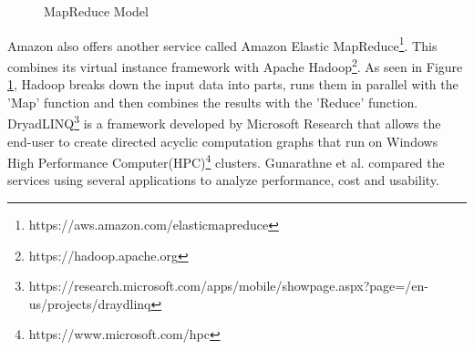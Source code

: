 \documentclass[12pt]{article}
\begin{document}
\begin{figure}
    \begin{center}
    \end{center}
    \caption{MapReduce Model}
    \label{fig:map}
\end{figure}

Amazon also offers another service called Amazon Elastic
MapReduce\footnote{https://aws.amazon.com/elasticmapreduce}. This combines its
virtual instance framework with Apache
Hadoop\footnote{https://hadoop.apache.org}. As seen in Figure \ref{fig:map},
Hadoop breaks down the input data into parts, runs them in parallel with the
'Map' function and then combines the results with the 'Reduce' function.
DryadLINQ\footnote{https://research.microsoft.com/apps/mobile/showpage.aspx?page=/en-us/projects/draydlinq}
is a framework developed by Microsoft Research that allows the end-user to
create directed acyclic computation graphs that run on Windows High Performance
Computer(HPC)\footnote{https://www.microsoft.com/hpc} clusters.  Gunarathne et
al. compared the services using several applications to analyze performance,
cost and usability.
\end{document}
